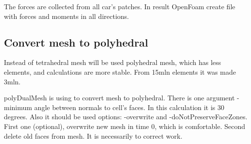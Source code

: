 The forces are collected from all car's patches. In result OpenFoam create file with forces and moments in all directions.


\subsection{Convert mesh to polyhedral}
Instead of tetrahedral mesh will be used polyhedral mesh, which has less elements, and calculations are more stable. From 15mln elements it was made 3mln. 

polyDualMesh is using to convert mesh to polyhedral. There is one argument - minimum angle between normals to cell's faces. In this calculation it is 30 degrees. Also it should be used options: -overwrite and -doNotPreserveFaceZones. First one (optional), overwrite new mesh in time 0, which is  comfortable. Second delete old faces from mesh. It is necessarily to correct work.

